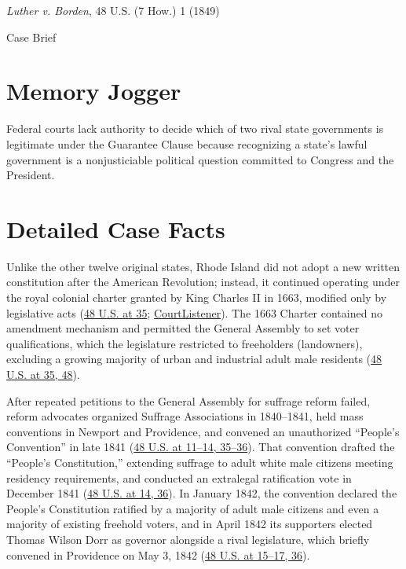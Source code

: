 \documentclass[12pt]{article}
\begin{document}
\begin{center}
{\LARGE \textit{Luther v. Borden}, 48 U.S. (7 How.) 1 (1849)\par}
\vspace{0.8em}
{\large Case Brief\par}
\end{center}
\vspace{1em}

\section{Memory Jogger}

Federal courts lack authority to decide which of two rival state governments is legitimate under the Guarantee Clause because recognizing a state's lawful government is a nonjusticiable political question committed to Congress and the President.

\section{Detailed Case Facts}

Unlike the other twelve original states, Rhode Island did not adopt a new written constitution after the American Revolution; instead, it continued operating under the royal colonial charter granted by King Charles II in 1663, modified only by legislative acts (\href{https://supreme.justia.com/cases/federal/us/48/1/}{48 U.S. at 35}; \href{https://www.courtlistener.com/opinion/86466/luther-v-borden/}{CourtListener}). The 1663 Charter contained no amendment mechanism and permitted the General Assembly to set voter qualifications, which the legislature restricted to freeholders (landowners), excluding a growing majority of urban and industrial adult male residents (\href{https://supreme.justia.com/cases/federal/us/48/1/}{48 U.S. at 35, 48}).

After repeated petitions to the General Assembly for suffrage reform failed, reform advocates organized Suffrage Associations in 1840--1841, held mass conventions in Newport and Providence, and convened an unauthorized ``People's Convention'' in late 1841 (\href{https://supreme.justia.com/cases/federal/us/48/1/}{48 U.S. at 11--14, 35--36}). That convention drafted the ``People's Constitution,'' extending suffrage to adult white male citizens meeting residency requirements, and conducted an extralegal ratification vote in December 1841 (\href{https://supreme.justia.com/cases/federal/us/48/1/}{48 U.S. at 14, 36}). In January 1842, the convention declared the People's Constitution ratified by a majority of adult male citizens and even a majority of existing freehold voters, and in April 1842 its supporters elected Thomas Wilson Dorr as governor alongside a rival legislature, which briefly convened in Providence on May 3, 1842 (\href{https://supreme.justia.com/cases/federal/us/48/1/}{48 U.S. at 15--17, 36}).
\end{document}
